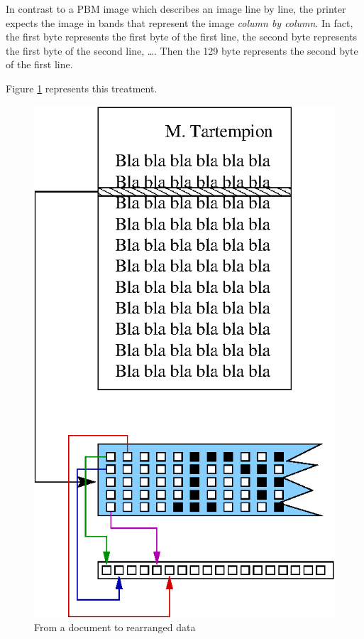 In contrast to a PBM image which describes an image line by line, the printer expects the
image in bands that represent the image \emph{column by column}. In fact, the first
byte represents the first byte of the first line, the second byte represents the first byte of the second line, \ldots. Then the 129 byte represents the second byte of the first line.

Figure \ref{fig:bande} represents this treatment.

\begin{figure}[ht]
\centering
\includegraphics{Images/bande.eps}
\caption{From a document to rearranged data}
\label{fig:bande}
\end{figure}

